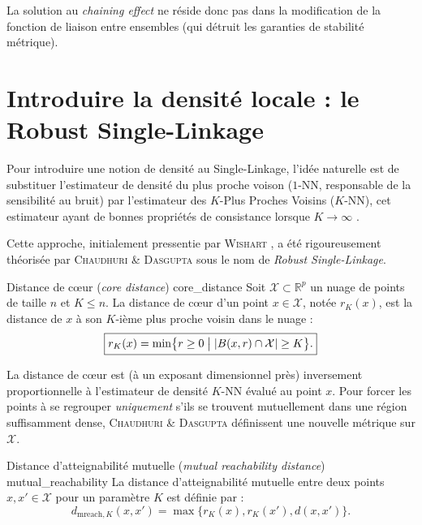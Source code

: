La solution au \emph{chaining effect} ne réside donc pas dans la modification de la fonction de liaison entre ensembles (qui détruit les garanties de stabilité métrique). %


\section{Introduire la densité locale : le Robust Single-Linkage}
\label{sec:robust_single_linkage}

Pour introduire une notion de densité au Single-Linkage, l'idée naturelle est de substituer l'estimateur de densité du plus proche voison ($1$-NN, responsable de la sensibilité au bruit) par l'estimateur des $K$-Plus Proches Voisins ($K$-NN), cet estimateur ayant de bonnes propriétés de consistance lorsque $K \to \infty$ \cite{BiauDevroye}. 

Cette approche, initialement pressentie par \textsc{Wishart} \cite{RobustSingleLinkage1969}, a été rigoureusement théorisée par \textsc{Chaudhuri} \& \textsc{Dasgupta} \cite{RobustSingleLinkage2010} sous le nom de \emph{Robust Single-Linkage}.

\begin{Definition}{Distance de cœur (\emph{core distance}) \cite{OPTICS1999}}{core_distance}
Soit $\mathcal{X} \subset \mathbb R^p$ un nuage de points de taille $n$ et $K \le n$. La distance de cœur d'un point $x \in \mathcal{X}$, notée $r_K(x)$, est la distance de $x$ à son $K$-ième plus proche voisin dans le nuage :
\[
\boxed{
    r_K(x) = \min \bigl\{ r \ge 0 \bigm| \lvert B(x, r) \cap \mathcal{X} \rvert \ge K \bigr\}.
    }
\]
\end{Definition}

La distance de cœur est (à un exposant dimensionnel près) inversement proportionnelle à l'estimateur de densité $K$-NN évalué au point $x$. Pour forcer les points à se regrouper \emph{uniquement} s'ils se trouvent mutuellement dans une région suffisamment dense, \textsc{Chaudhuri} \& \textsc{Dasgupta} \cite{RobustSingleLinkage2010} définissent une nouvelle métrique sur $\mathcal{X}$.

\begin{Definition}{Distance d'atteignabilité mutuelle (\emph{mutual reachability distance}) \cite{RobustSingleLinkage2010}}{mutual_reachability}
La distance d'atteignabilité mutuelle entre deux points $x, x' \in \mathcal{X}$ pour un paramètre $K$ est définie par :
\[
\boxed{
    d_{\mathrm{mreach}, K}(x, x') = \max \bigl\{ r_K(x), r_K(x'), d(x, x') \bigr\}.
    }
\]
\end{Definition}

